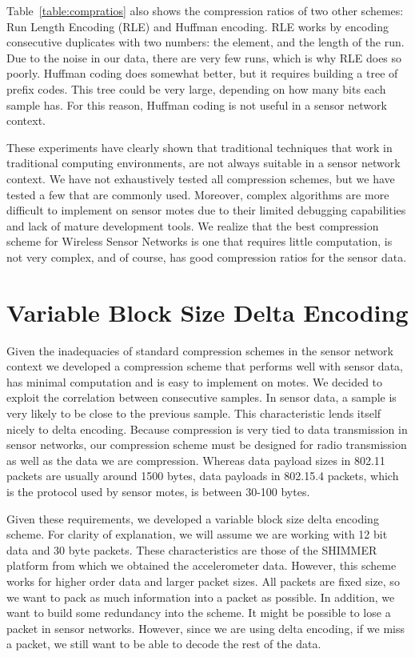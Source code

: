 Table~\ref{table:compratios} also shows the compression ratios of two
other schemes: Run Length Encoding (RLE) and Huffman encoding. RLE
works by encoding consecutive duplicates with two numbers: the
element, and the length of the run. Due to the noise in our data,
there are very few runs, which is why RLE does so poorly. Huffman
coding does somewhat better, but it requires building a tree of prefix
codes. This tree could be very large, depending on how many bits each
sample has. For this reason, Huffman coding is not useful in a sensor
network context. 

These experiments have clearly shown that traditional techniques that
work in traditional computing environments, are not always suitable in
a sensor network context. We have not exhaustively tested all
compression schemes, but we have tested a few that are commonly
used. Moreover, complex algorithms are more difficult to implement on
sensor motes due to their limited debugging capabilities and lack of
mature development tools. We realize that the best compression scheme
for Wireless Sensor Networks is one that requires little computation,
is not very complex, and of course, has good compression ratios for
the sensor data.

\section{Variable Block Size Delta Encoding}
\label{sec-delta}

Given the inadequacies of standard compression schemes in the sensor
network context we developed a compression scheme that performs well
with sensor data, has minimal computation and is easy to implement on
motes. We decided to exploit the correlation between consecutive
samples. In sensor data, a sample is very likely to be close to the
previous sample. This characteristic lends itself nicely to delta
encoding. Because compression is very tied to data transmission in
sensor networks, our compression scheme must be designed for radio
transmission as well as the data we are compression. Whereas data
payload sizes in 802.11 packets are usually around 1500 bytes, data
payloads in 802.15.4 packets, which is the protocol used by sensor
motes, is between 30-100 bytes.

Given these requirements, we developed a variable block size delta
encoding scheme. For clarity of explanation, we will assume we are
working with 12 bit data and 30 byte packets. These characteristics
are those of the SHIMMER platform from which we obtained the
accelerometer data. However, this scheme works for higher order data
and larger packet sizes. All packets are fixed size, so we want to pack
as much information into a packet as possible. In addition, we want to
build some redundancy into the scheme. It might be possible to lose a
packet in sensor networks. However, since we are using delta encoding,
if we miss a packet, we still want to be able to decode the rest of
the data.

